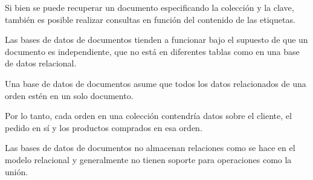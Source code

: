 Si bien se puede recuperar un documento especificando la colección y la clave, también es posible realizar consultas en función del contenido de las etiquetas.


Las bases de datos de documentos tienden a funcionar bajo el supuesto de que un documento es independiente, que no está en diferentes tablas como en una base de datos relacional.


Una base de datos de documentos asume que todos los datos relacionados de una orden estén en un solo documento. 


Por lo tanto, cada orden en una colección contendría datos sobre el cliente, el pedido en sí y los productos comprados en esa orden.


Las bases de datos de documentos no almacenan relaciones como se hace en el modelo relacional y generalmente no tienen soporte para operaciones como la unión.
